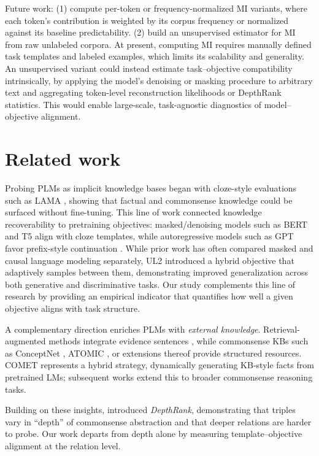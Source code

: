 \documentclass{i4c-en}
\begin{document}
	Future work: (1) compute per-token or frequency-normalized MI variants, where each token’s contribution is weighted by its corpus frequency or normalized against its baseline predictability. (2) build an unsupervised estimator for MI from raw unlabeled corpora. At present, computing MI requires manually defined task templates and labeled examples, which limits its scalability and generality. An unsupervised variant could instead estimate task–objective compatibility intrinsically, by applying the model’s denoising or masking procedure to arbitrary text and aggregating token-level reconstruction likelihoods or DepthRank statistics. This would enable large-scale, task-agnostic diagnostics of model–objective alignment. 
	

	\section{Related work} \label{sec:related}
	Probing PLMs as implicit knowledge bases began with cloze-style evaluations such as LAMA \cite{petroni2019language}, showing that factual and commonsense knowledge could be surfaced without fine-tuning. This line of work connected knowledge recoverability to pretraining objectives: masked/denoising models such as BERT and T5 \cite{devlin2019bert,raffel2020exploring} align with cloze templates, while autoregressive models such as GPT favor prefix-style continuation \cite{radford2019language,brown2020language,liu2021robust}. 
	While prior work has often compared masked and causal language modeling separately, UL2 \cite{ul2} introduced a hybrid objective that adaptively samples between them, demonstrating improved generalization across both generative and discriminative tasks. Our study complements this line of research by providing an empirical indicator that quantifies how well a given objective aligns with task structure.

	
A complementary direction enriches PLMs with \emph{external knowledge}. Retrieval-augmented methods integrate evidence sentences \cite{yu2022retrieval}, while commonsense KBs such as ConceptNet \cite{speer2016conceptnet}, ATOMIC \cite{sap2019atomic,hwang2020comet}, or extensions thereof \cite{choi2022kbc} provide structured resources. COMET \cite{bosselut2019comet} represents a hybrid strategy, dynamically generating KB-style facts from pretrained LMs; subsequent works \cite{ghazarian2023accent,tian2023harnessing} extend this to broader commonsense reasoning tasks.

	
	Building on these insights, \cite{zhang2021alleviating} introduced \emph{DepthRank}, demonstrating that triples vary in “depth” of commonsense abstraction and that deeper relations are harder to probe. Our work departs from depth alone by measuring template–objective alignment at the relation level.
	
\end{document}
